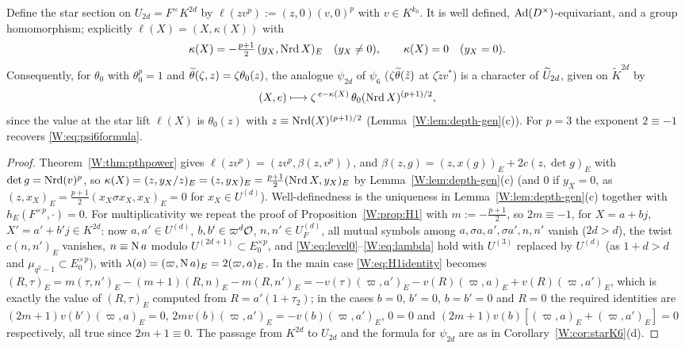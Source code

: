 \begin{theorem}\label{W:thm:H1-gen}
Define the star section on $U_{2d}=F^\times K^{2d}$ by
$\ell(zv^p):=(z,0)(v,0)^p$ with $v\in K^{k_0}$.  It is well defined,
$\operatorname{Ad}(D^\times)$-equivariant, and a group homomorphism; explicitly
$\ell(X)=(X,\kappa(X))$ with
\[
 \kappa(X)=-\tfrac{p+1}2\,(y_X,\operatorname{Nrd} X)_E\quad(y_X\ne0),\qquad \kappa(X)=0\quad(y_X=0).
\]
Consequently, for $\theta_0$ with $\theta_0^p=1$ and
$\widetilde\theta(\zeta,z)=\zeta\theta_0(z)$, the analogue $\psi_{2d}$ of $\psi_6$
($\zeta\widetilde\theta(\tilde z)$ at $\zeta\tilde zv^*$) is a character of
$\widetilde U_{2d}$, given on $\tilde K^{2d}$ by
\[
 (X,e)\longmapsto\zeta^{\,e-\kappa(X)}\,\theta_0(\operatorname{Nrd} X)^{(p+1)/2},
\]
since the value at the star lift $\ell(X)$ is $\theta_0(z)$ with
$z\equiv\operatorname{Nrd}(X)^{(p+1)/2}$ (Lemma~\ref{W:lem:depth-gen}(c)).  For $p=3$
the exponent $2\equiv-1$ recovers \eqref{W:eq:psi6formula}.
\end{theorem}
\begin{proof}
Theorem~\ref{W:thm:pthpower} gives $\ell(zv^p)=(zv^p,\beta(z,v^p))$, and
$\beta(z,g)=(z,x(g))_E+2c(z,\det g)_E$ with $\det g=\operatorname{Nrd}(v)^p$, so
$\kappa(X)=(z,y_X/z)_E=(z,y_X)_E=\tfrac{p+1}2(\operatorname{Nrd} X,y_X)_E$ by
Lemma~\ref{W:lem:depth-gen}(c) (and $0$ if $y_X=0$, as
$(z,x_X)_E=\tfrac{p+1}2(x_X\sigma x_X,x_X)_E=0$ for $x_X\in U^{(d)}$).
Well-definedness is the uniqueness in Lemma~\ref{W:lem:depth-gen}(c)
together with $h_E(F^{\times p},\cdot)=0$.  For multiplicativity we
repeat the proof of Proposition~\ref{W:prop:H1} with $m:=-\tfrac{p+1}2$,
so $2m\equiv-1$, for $X=a+bj$, $X'=a'+b'j\in K^{2d}$: now
$a,a'\in U^{(d)}$, $b,b'\in\varpi^d\mathcal O$, $n,n'\in U_F^{(d)}$, all mutual
symbols among $a,\sigma a,a',\sigma a',n,n'$ vanish ($2d>d$), the twist
$c(n,n')_E$ vanishes, $n\equiv\operatorname N a$ modulo $U^{(2d+1)}\subset E_0^{\times p}$,
and \eqref{W:eq:level0}--\eqref{W:eq:lambda} hold with $U^{(3)}$ replaced by
$U^{(d)}$ (as $1+d>d$ and $\mu_{q^2-1}\subset E_0^{\times p}$), with
$\lambda(a)=(\varpi,\operatorname N a)_E=2(\varpi,a)_E$.  In the main case
\eqref{W:eq:H1identity} becomes
$(R,\tau)_E=m(\tau,n')_E-(m+1)(R,n)_E-m(R,n')_E=-v(\tau)(\varpi,a')_E-v(R)(\varpi,a)_E+v(R)(\varpi,a')_E$,
which is exactly the value of $(R,\tau)_E$ computed from
$R=a'(1+\tau_2)$; in the cases $b=0$, $b'=0$, $b=b'=0$ and $R=0$
the required identities are $(2m+1)v(b')(\varpi,a)_E=0$,
$2mv(b)(\varpi,a')_E=-v(b)(\varpi,a')_E$, $0=0$ and
$(2m+1)v(b)[(\varpi,a)_E+(\varpi,a')_E]=0$ respectively, all true since
$2m+1\equiv0$.  The passage from $K^{2d}$ to $U_{2d}$ and the formula
for $\psi_{2d}$ are as in Corollary~\ref{W:cor:starK6}(d).
\end{proof}


